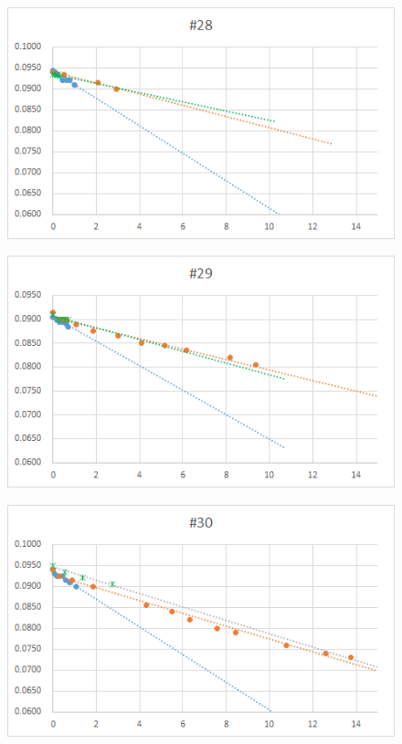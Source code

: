 \documentclass[12pt,a4paper]{jarticle}
\begin{document}
\begin{figure}[htbp]
  \centering
     \includegraphics[width=120mm]{vol_028.png}
\end{figure}
\begin{figure}[htbp]
  \centering
     \includegraphics[width=120mm]{vol_029.png}
\end{figure}
\begin{figure}[htbp]
  \centering
     \includegraphics[width=120mm]{vol_030.png}
\end{figure}
\end{document}
